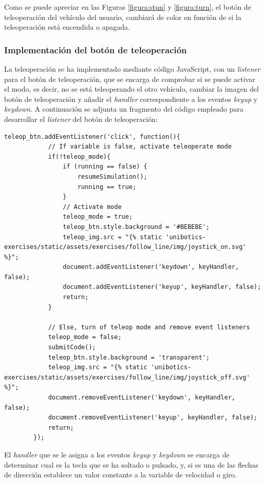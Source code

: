 \documentclass[a4paper, 12pt]{book}
\begin{document}
Como se puede apreciar en las Figuras \ref{figura:stun} y \ref{figura:turn}, el botón de teleoperación del vehículo del usuario, cambiará de color en función de si la teleoperación está encendida o apagada.

\subsubsection{Implementación del botón de teleoperación}
\label{follow_line_game_mode_teleoperado_impl}

La teleoperación se ha implementado mediante código JavaScript, con un \emph{listener} para el botón de teleoperación, que se encarga de comprobar si se puede activar el modo, es decir, no se está teleoperando el otro vehículo, cambiar la imagen del botón de teleoperación y añadir el \emph{handler} correspondiente a los eventos \emph{keyup} y \emph{keydown}. A continuación se adjunta un fragmento del código empleado para desarrollar el \emph{listener} del botón de teleoperación:


\begin{lstlisting}[basicstyle=\ttfamily\scriptsize]
teleop_btn.addEventListener('click', function(){
			// If variable is false, activate teleoperate mode
			if(!teleop_mode){
				if (running == false) {
					resumeSimulation();
					running == true;
				}
				// Activate mode
				teleop_mode = true;
				teleop_btn.style.background = '#BEBEBE';
				teleop_img.src = "{% static 'unibotics-exercises/static/assets/exercises/follow_line/img/joystick_on.svg' %}";
				document.addEventListener('keydown', keyHandler, false);
				document.addEventListener('keyup', keyHandler, false);
				return;
			}

			// Else, turn of teleop mode and remove event listeners
			teleop_mode = false;
			submitCode();
			teleop_btn.style.background = 'transparent';
			teleop_img.src = "{% static 'unibotics-exercises/static/assets/exercises/follow_line/img/joystick_off.svg' %}";
			document.removeEventListener('keydown', keyHandler, false);
			document.removeEventListener('keyup', keyHandler, false);
			return;
		});
\end{lstlisting}

El \emph{handler} que se le asigna a los eventos \emph{keyup} y \emph{keydown} se encarga de determinar cual es la tecla que se ha soltado o pulsado, y, si es una de las flechas de dirección establece un valor constante a la variable de velocidad o giro.
\end{document}
